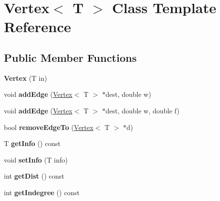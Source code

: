 \hypertarget{classVertex}{\section{Vertex$<$ T $>$ Class Template Reference}
\label{classVertex}
}
\subsection*{Public Member Functions}
\begin{DoxyCompactItemize}
\item 
\hypertarget{classVertex_afcbdd4d4198b672356559cb8fa088408}{{\bfseries Vertex} (T in)}\label{classVertex_afcbdd4d4198b672356559cb8fa088408}

\item 
\hypertarget{classVertex_aeb024eced2da142912f189af6a454db3}{void {\bfseries add\-Edge} (\hyperlink{classVertex}{Vertex}$<$ T $>$ $\ast$dest, double w)}\label{classVertex_aeb024eced2da142912f189af6a454db3}

\item 
\hypertarget{classVertex_a4cab9e6138665f498b1688359e50c241}{void {\bfseries add\-Edge} (\hyperlink{classVertex}{Vertex}$<$ T $>$ $\ast$dest, double w, double f)}\label{classVertex_a4cab9e6138665f498b1688359e50c241}

\item 
\hypertarget{classVertex_ab2b5b43fb1709a901b78718436763a84}{bool {\bfseries remove\-Edge\-To} (\hyperlink{classVertex}{Vertex}$<$ T $>$ $\ast$d)}\label{classVertex_ab2b5b43fb1709a901b78718436763a84}

\item 
\hypertarget{classVertex_a5880b4b252ae6818819c2f9645784b59}{T {\bfseries get\-Info} () const }\label{classVertex_a5880b4b252ae6818819c2f9645784b59}

\item 
\hypertarget{classVertex_a31cd60c26640f8072a928ba70eb2f95e}{void {\bfseries set\-Info} (T info)}\label{classVertex_a31cd60c26640f8072a928ba70eb2f95e}

\item 
\hypertarget{classVertex_a3379c6cbcf1eaacc098381e3557a0b52}{int {\bfseries get\-Dist} () const }\label{classVertex_a3379c6cbcf1eaacc098381e3557a0b52}

\item 
\hypertarget{classVertex_a305ef01582f945f22134abb9294fe1f3}{int {\bfseries get\-Indegree} () const }\label{classVertex_a305ef01582f945f22134abb9294fe1f3}


\end{DoxyCompactItemize}
